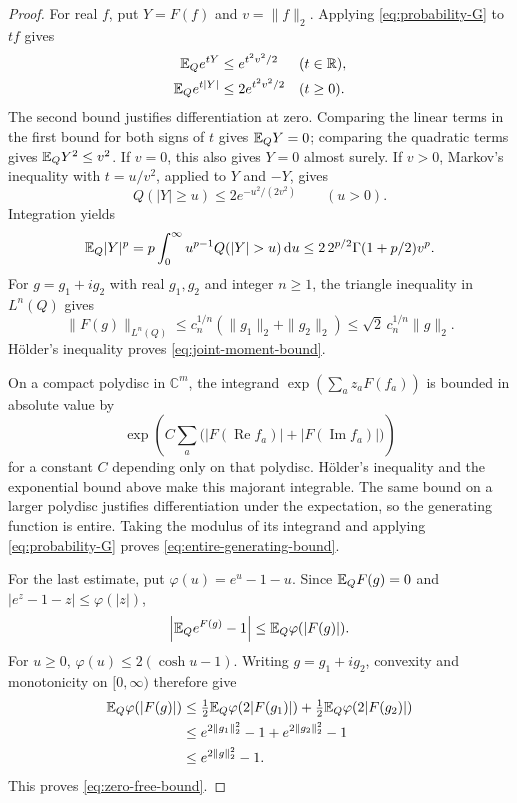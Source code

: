 \begin{proof}
For real $f$, put $Y=F(f)$ and $v=\|f\|_2$. Applying
\eqref{eq:probability-G} to $tf$ gives
\begin{align*}
 \mathbb E_Q e^{tY}&\le e^{t^2v^2/2} &&(t\in\mathbb R),\\
 \mathbb E_Q e^{t|Y|}&\le2e^{t^2v^2/2} &&(t\ge0).
\end{align*}
The second bound justifies differentiation at zero. Comparing
the linear terms in the first bound for both signs of $t$
gives $\mathbb E_QY=0$; comparing the quadratic terms gives
$\mathbb E_QY^2\le v^2$. If $v=0$, this also gives $Y=0$ almost
surely. If $v>0$, Markov's inequality with $t=u/v^2$,
applied to $Y$ and $-Y$, gives
\[
 Q(|Y|\ge u)\le2e^{-u^2/(2v^2)}\qquad(u>0).
\]
Integration yields
\[
 \E_Q|Y|^p
 =p\int_0^\infty u^{p-1}Q(|Y|>u)\,\dd u
 \le2\,2^{p/2}\Gamma(1+p/2)v^p.
\]
For $g=g_1+ig_2$ with real $g_1,g_2$ and integer $n\ge1$,
the triangle inequality in $L^n(Q)$ gives
\[
 \|F(g)\|_{L^n(Q)}
 \le c_n^{1/n}(\|g_1\|_2+\|g_2\|_2)
 \le\sqrt2\,c_n^{1/n}\|g\|_2.
\]
H\"older's inequality proves \eqref{eq:joint-moment-bound}.

On a compact polydisc in $\mathbb C^m$, the integrand
$\exp(\sum_a z_aF(f_a))$ is bounded in absolute value by
\[
 \exp\left(C\sum_a
       \bigl(|F(\operatorname{Re}f_a)|
             +|F(\operatorname{Im}f_a)|\bigr)\right)
\]
for a constant $C$ depending only on that polydisc. H\"older's
inequality and the exponential bound above make this majorant
integrable. The same bound on a larger polydisc justifies
differentiation under the expectation, so the generating
function is entire. Taking the modulus of its integrand and
applying \eqref{eq:probability-G} proves
\eqref{eq:entire-generating-bound}.

For the last estimate, put $\varphi(u)=e^u-1-u$. Since
$\mathbb E_Q F(g)=0$ and $|e^z-1-z|\le\varphi(|z|)$,
\[
 \left|\mathbb E_Q e^{F(g)}-1\right|
 \le\mathbb E_Q\varphi(|F(g)|).
\]
For $u\ge0$, $\varphi(u)\le2(\cosh u-1)$. Writing
$g=g_1+ig_2$, convexity and monotonicity on $[0,\infty)$
therefore give
\begin{align*}
 \mathbb E_Q\varphi(|F(g)|)
 &\le\tfrac12\mathbb E_Q\varphi(2|F(g_1)|)
       +\tfrac12\mathbb E_Q\varphi(2|F(g_2)|)\\
 &\le e^{2\|g_1\|_2^2}-1+e^{2\|g_2\|_2^2}-1\\
 &\le e^{2\|g\|_2^2}-1.
\end{align*}
This proves \eqref{eq:zero-free-bound}.
\end{proof}

